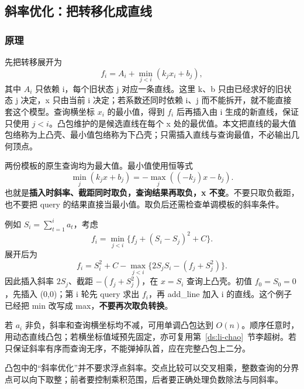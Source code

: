 \subsection{斜率优化：把转移化成直线}
\label{dp:slope-basics}
\subsubsection*{原理}

先把转移展开为
\[
 f_i=A_i+\min_{j<i}(k_jx_i+b_j),
\]
其中 $A_i$ 只依赖 i，每个旧状态 j 对应一条直线。这里 k、b 只由已经求好的旧状态 j 决定，x 只由当前 i 决定；若系数还同时依赖 i、j 而不能拆开，就不能直接套这个模型。查询横坐标 $x_i$ 的最小值，得到 $f_i$ 后再插入由 i 生成的新直线，保证只使用 $j<i$。凸包维护的是候选直线在每个 x 处的最优值。本文把直线的最大值包络称为上凸壳、最小值包络称为下凸壳；只需插入直线与查询最值，不必输出几何顶点。

两份模板的原生查询均为最大值。最小值使用恒等式
\[
 \min_j(k_jx+b_j)=-\max_j((-k_j)x-b_j).
\]
也就是\textbf{插入时斜率、截距同时取负，查询结果再取负，x 不变}。不要只取负截距，也不要把 query 的结果直接当最小值。取负后还需检查单调模板的斜率条件。

例如 $S_i=\sum_{t=1}^i a_t$，考虑
\[
 f_i=\min_{j<i}\{f_j+(S_i-S_j)^2+C\}.
\]
展开后为
\[
 f_i=S_i^2+C-\max_{j<i}\{2S_jS_i-(f_j+S_j^2)\}.
\]
因此插入斜率 $2S_j$、截距 $-(f_j+S_j^2)$，在 $x=S_i$ 查询上凸壳。初值 $f_0=S_0=0$，先插入 (0,0)；第 i 轮先 query 求出 $f_i$，再 add\_line 加入 i 的直线。这个例子已经把 min 改写成 max，\textbf{不要再次取负转换}。

若 $a_i$ 非负，斜率和查询横坐标均不减，可用单调凸包达到 $O(n)$。顺序任意时，用动态直线凸包；若横坐标值域预先固定，亦可复用第~\ref{ds:li-chao}~节李超树。若只保证斜率有序而查询无序，不能弹掉队首，应在完整凸包上二分。

凸包中的“斜率优化”并不要求浮点斜率。交点比较可以交叉相乘，整数查询的分界点可以向下取整；前者要控制乘积范围，后者要正确处理负数除法与同斜率。
